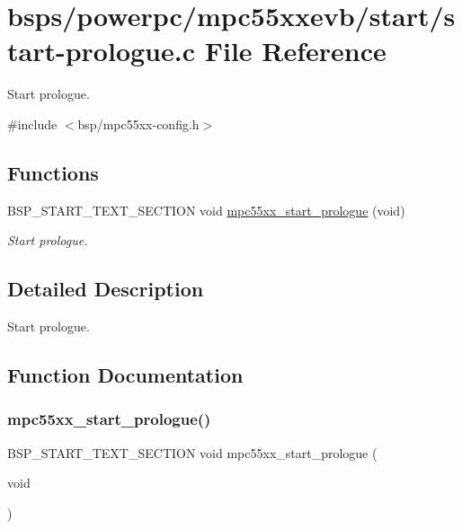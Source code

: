 \hypertarget{start-prologue_8c}{}\section{bsps/powerpc/mpc55xxevb/start/start-\/prologue.c File Reference}
\label{start-prologue_8c}


Start prologue.  


{\ttfamily \#include $<$bsp/mpc55xx-\/config.\+h$>$}\newline
\subsection*{Functions}
\begin{DoxyCompactItemize}
\item 
B\+S\+P\+\_\+\+S\+T\+A\+R\+T\+\_\+\+T\+E\+X\+T\+\_\+\+S\+E\+C\+T\+I\+ON void \mbox{\hyperlink{start-prologue_8c_a48ab48d450af017b3f51aa83e2d7836f}{mpc55xx\+\_\+start\+\_\+prologue}} (void)
\begin{DoxyCompactList}\small\item\em Start prologue. \end{DoxyCompactList}\end{DoxyCompactItemize}


\subsection{Detailed Description}
Start prologue. 



\subsection{Function Documentation}
\mbox{\label{start-prologue_8c_a48ab48d450af017b3f51aa83e2d7836f}} 
\subsubsection{\texorpdfstring{mpc55xx\_start\_prologue()}{mpc55xx\_start\_prologue()}}
{\footnotesize\ttfamily B\+S\+P\+\_\+\+S\+T\+A\+R\+T\+\_\+\+T\+E\+X\+T\+\_\+\+S\+E\+C\+T\+I\+ON void mpc55xx\+\_\+start\+\_\+prologue (\begin{DoxyParamCaption}\item[{void}]{ }\end{DoxyParamCaption})}




